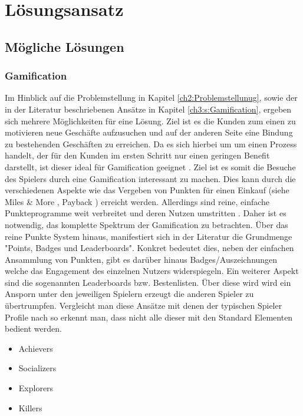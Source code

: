\chapter{Lösungsansatz}
\label{sec:S4_Lösungsansatz}

\section{Mögliche Lösungen}

\subsection*{Gamification}

Im Hinblick auf die Problemstellung in Kapitel \ref{ch2:Problemstellunug}, sowie der in der Literatur beschriebenen Ansätze in Kapitel \ref{ch3:s:Gamification}, ergeben sich mehrere Möglichkeiten für eine Lösung. Ziel ist es die Kunden zum einen zu motivieren neue Geschäfte aufzusuchen und auf der anderen Seite eine Bindung zu bestehenden Geschäften zu erreichen. Da es sich hierbei um um einen Prozess handelt, der für den Kunden im ersten Schritt nur einen geringen Benefit darstellt, ist dieser ideal für Gamification geeignet \cite{Leigh.2012}. Ziel ist es somit die Besuche des Spielers durch eine Gamification interessant zu machen. Dies kann durch die verschiedenen Aspekte wie das Vergeben von Punkten für einen Einkauf (siehe Miles \& More \cite{Wagner.2005}, Payback \cite{Roesl.2005}) erreicht werden. Allerdings sind reine, einfache Punkteprogramme weit verbreitet und deren Nutzen umstritten \cite{Schmitt.2001}.
Daher ist es notwendig, das komplette Spektrum der Gamification zu betrachten.
Über das reine Punkte System hinaus, manifestiert sich in der Literatur die Grundmenge "Points, Badges und Leaderboards".
Konkret bedeutet dies, neben der einfachen Ansammlung von Punkten, gibt es darüber hinaus Badges/Auszeichnungen welche das Engagement des einzelnen Nutzers widerspiegeln. Ein weiterer Aspekt sind die sogenannten Leaderboards bzw. Bestenlisten. Über diese wird wird ein Ansporn unter den jeweiligen Spielern erzeugt die anderen Spieler zu übertrumpfen. Vergleicht man diese Ansätze mit denen der typischen Spieler Profile nach \citep{Bartle.2004} so erkennt man, dass nicht alle dieser mit den Standard Elementen bedient werden.

\begin{itemize}
\item Achievers
\item Socializers
\item Explorers
\item Killers
\end{itemize}

